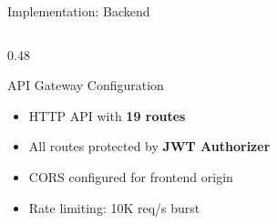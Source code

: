 \documentclass[aspectratio=169,11pt]{beamer}
\begin{document}
\begin{frame}[shrink=6]{Implementation: Backend}
\begin{columns}[T]
\begin{column}{0.48\textwidth}
\vspace{0.3em}
\begin{block}{API Gateway Configuration}
{\small
\begin{itemize}
    \item HTTP API with \textbf{19 routes}
    \item All routes protected by \textbf{JWT Authorizer}
    \item CORS configured for frontend origin
    \item Rate limiting: 10K req/s burst
\end{itemize}
}
\end{block}
\end{column}
\end{columns}
\end{frame}

\end{document}
